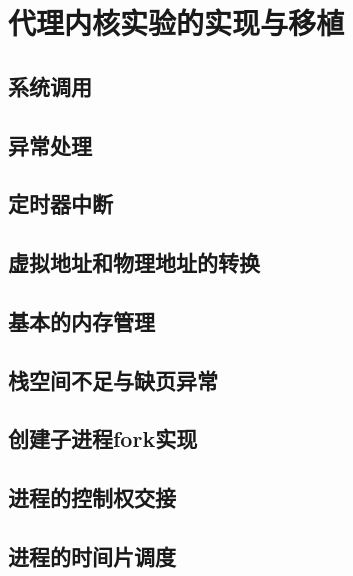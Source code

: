 
\chapter{代理内核实验的实现与移植}

\section{系统调用}

\section{异常处理}

\section{定时器中断}

\section{虚拟地址和物理地址的转换}

\section{基本的内存管理}

\section{栈空间不足与缺页异常}

\section{创建子进程fork实现}

\section{进程的控制权交接}

\section{进程的时间片调度}